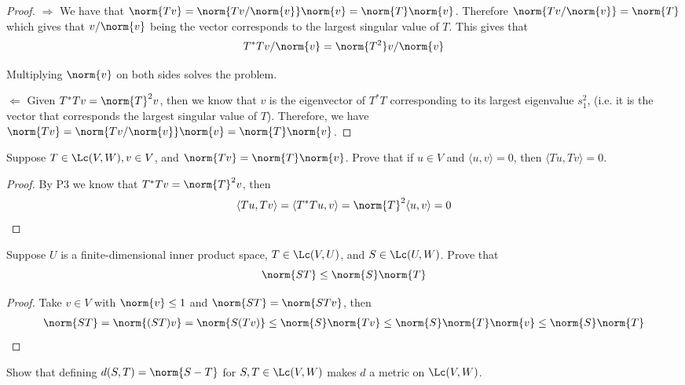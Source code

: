 \documentclass{extarticle}
\begin{document}
\begin{proof}
\(\Rightarrow\) We have that
\(\norm{Tv} = \norm{Tv / \norm{v}} \norm{v} = \norm{T} \norm{v}\).
Therefore \(\norm{Tv / \norm{v}} = \norm{T}\) which
gives that \(v/\norm{v}\) being the vector corresponds to the largest
singular value of \(T\). This gives that
\[T^*T v/\norm{v} = \norm{T^2}v / \norm{v}\]

Multiplying \(\norm{v}\) on both sides solves the problem.

\(\Leftarrow\) Given \(T^*Tv = \norm{T}^2 v\), then we know
that \(v\) is the eigenvector of \(T^*T\) corresponding to
its largest eigenvalue \(s_1^2\), (i.e. it is the vector
that corresponds the largest singular value of \(T\)).
Therefore, we have \(\norm{Tv} =
\norm{Tv / \norm{v}} \norm{v}= \norm{T} \norm{v}\).
\end{proof}

\begin{problem}{4}
    Suppose \(T \in \Lc(V, W), v \in V\), and
    \(\norm{Tv} = \norm{T} \norm{v}\). Prove that if
    \(u \in V\) and \(\langle u,v \rangle = 0\), then
    \(\langle Tu,Tv \rangle = 0\).
\end{problem}

\begin{proof}
By P3 we know that \(T^*T v = \norm{T}^2 v\), then
\[\langle Tu,Tv \rangle
= \langle T^*Tu,v \rangle = \norm{T}^2 \langle u,v \rangle = 0\]
\end{proof}

\begin{problem}{5}
    Suppose \(U\) is a finite-dimensional inner product
    space, \(T \in \Lc(V, U)\), and \(S \in \Lc(U, W)\).
    Prove that
    \[\norm{ST} \leq \norm{S} \norm{T}\]
\end{problem}

\begin{proof}
Take \(v \in V\) with \(\norm{v} \leq 1\) and
\(\norm{ST} = \norm{ST v}\), then
\begin{align*}
    \norm{ST}
    = \norm{(ST)v}
    = \norm{S(Tv)}
    \leq \norm{S}\norm{Tv}
    \leq \norm{S} \norm{T} \norm{v}
    \leq \norm{S} \norm{T}
\end{align*}
\end{proof}

\begin{problem}{7}
    Show that defining \(d(S, T) = \norm{S - T}\) for
    \(S, T \in \Lc(V, W)\) makes \(d\) a metric on
    \(\Lc(V, W)\).
\end{problem}
\end{document}

